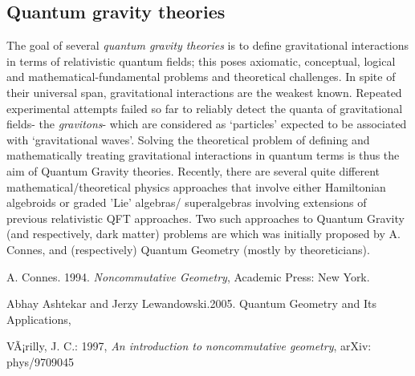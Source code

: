 \documentclass[12pt]{article}
\begin{document}
\subsection{Quantum gravity theories}

The goal of several \emph{quantum gravity theories} is to define gravitational interactions in terms of relativistic quantum fields; this poses axiomatic, conceptual, logical and mathematical-fundamental problems and theoretical 
challenges. In spite of their universal span, gravitational interactions are the 
weakest known. Repeated experimental attempts failed so far to reliably detect the quanta of gravitational fields-
the {\em gravitons}- which are considered as `particles' expected to be associated
with `gravitational waves'. Solving the theoretical problem of defining and mathematically treating gravitational interactions in quantum terms is thus the aim of Quantum Gravity theories. Recently, there are several quite different
mathematical/theoretical physics approaches that involve either Hamiltonian algebroids or graded 'Lie' algebras/ superalgebras involving extensions of previous relativistic QFT approaches. Two such 
approaches to Quantum Gravity (and respectively, dark matter) problems are 
 which was initially proposed by A. Connes, and (respectively) Quantum Geometry (mostly by theoreticians). 


\begin{thebibliography}{9}
A. Connes. 1994. \emph{Noncommutative Geometry}, Academic Press: New York.
 
Abhay Ashtekar and Jerzy Lewandowski.2005. Quantum Geometry and Its Applications,\\

VÃ¡rilly, J. C.: 1997, \emph{An introduction to noncommutative geometry}, arXiv: phys/9709045
\end{thebibliography} 
\end{document}
